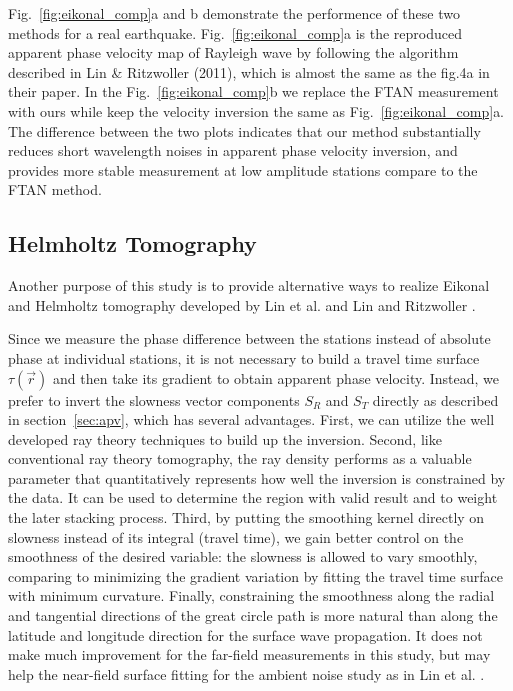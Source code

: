 \documentclass[referee]{gji}
\begin{document}
Fig.~\ref{fig:eikonal_comp}a and b demonstrate the performence of these two methods for a real earthquake. Fig.~\ref{fig:eikonal_comp}a is the reproduced apparent phase velocity map of Rayleigh wave by following the algorithm described in Lin \& Ritzwoller (2011), which is almost the same as the fig.4a in their paper. In the Fig.~\ref{fig:eikonal_comp}b we replace the FTAN measurement with ours while keep the velocity inversion the same as Fig.~\ref{fig:eikonal_comp}a. The difference between the two plots indicates that our method substantially reduces short wavelength noises in apparent phase velocity inversion, and provides more stable measurement at low amplitude stations compare to the FTAN method. 

\subsection{Helmholtz Tomography}
\label{sec:helm_dis}

Another purpose of this study is to provide alternative ways to realize Eikonal and Helmholtz tomography developed by Lin et al.  and Lin and Ritzwoller . 

Since we measure the phase difference between the stations instead of absolute phase at individual stations, it is not necessary to build a travel time surface $\tau(\vec{r})$ and then take its gradient to obtain apparent phase velocity. Instead, we prefer to invert the slowness vector components $S_R$ and $S_T$ directly as described in section~\ref{sec:apv}, which has several advantages. First, we can utilize the  well developed ray theory techniques to build up the inversion. Second, like conventional ray theory tomography, the ray density performs as a valuable parameter that quantitatively represents how well the inversion is constrained by the data. It can be used to determine the region with valid result and to weight the later stacking process. Third, by putting the smoothing kernel directly on slowness instead of its integral (travel time), we gain better control on the smoothness of the desired variable: the slowness is allowed to vary smoothly, comparing to minimizing the gradient variation by fitting the travel time surface with minimum curvature. Finally, constraining the smoothness along the radial and tangential directions of the great circle path is more natural than along the latitude and longitude direction for the surface wave propagation. It does not make much improvement for the far-field measurements in this study, but may help the near-field surface fitting for the ambient noise study as in Lin et al. .
\end{document}
